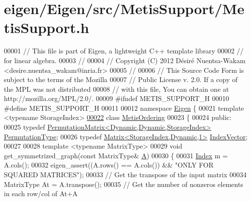 \hypertarget{eigen_2_eigen_2src_2_metis_support_2_metis_support_8h_source}{}\section{eigen/\+Eigen/src/\+Metis\+Support/\+Metis\+Support.h}
\label{eigen_2_eigen_2src_2_metis_support_2_metis_support_8h_source}

\begin{DoxyCode}
00001 \textcolor{comment}{// This file is part of Eigen, a lightweight C++ template library}
00002 \textcolor{comment}{// for linear algebra.}
00003 \textcolor{comment}{//}
00004 \textcolor{comment}{// Copyright (C) 2012 Désiré Nuentsa-Wakam <desire.nuentsa\_wakam@inria.fr>}
00005 \textcolor{comment}{//}
00006 \textcolor{comment}{// This Source Code Form is subject to the terms of the Mozilla}
00007 \textcolor{comment}{// Public License v. 2.0. If a copy of the MPL was not distributed}
00008 \textcolor{comment}{// with this file, You can obtain one at http://mozilla.org/MPL/2.0/.}
00009 \textcolor{preprocessor}{#ifndef METIS\_SUPPORT\_H}
00010 \textcolor{preprocessor}{#define METIS\_SUPPORT\_H}
00011 
00012 \textcolor{keyword}{namespace }\hyperlink{namespace_eigen}{Eigen} \{
00021 \textcolor{keyword}{template} <\textcolor{keyword}{typename} StorageIndex>
\hyperlink{class_eigen_1_1_metis_ordering}{00022} \textcolor{keyword}{class }\hyperlink{class_eigen_1_1_metis_ordering}{MetisOrdering}
00023 \{
00024 \textcolor{keyword}{public}:
00025   \textcolor{keyword}{typedef} \hyperlink{group___core___module}{PermutationMatrix<Dynamic,Dynamic,StorageIndex>} 
      \hyperlink{group___core___module}{PermutationType};
00026   \textcolor{keyword}{typedef} \hyperlink{group___core___module}{Matrix<StorageIndex,Dynamic,1>} 
      \hyperlink{group___core___module}{IndexVector}; 
00027   
00028   \textcolor{keyword}{template} <\textcolor{keyword}{typename} MatrixType>
00029   \textcolor{keywordtype}{void} get\_symmetrized\_graph(\textcolor{keyword}{const} MatrixType& \hyperlink{group___core___module_class_eigen_1_1_matrix}{A})
00030   \{
00031     \hyperlink{namespace_eigen_a62e77e0933482dafde8fe197d9a2cfde}{Index} m = A.cols(); 
00032     eigen\_assert((A.rows() == A.cols()) && \textcolor{stringliteral}{"ONLY FOR SQUARED MATRICES"});
00033     \textcolor{comment}{// Get the transpose of the input matrix }
00034     MatrixType At = A.transpose(); 
00035     \textcolor{comment}{// Get the number of nonzeros elements in each row/col of At+A}

\end{DoxyCode}
